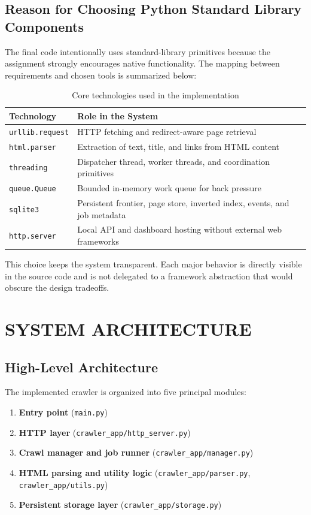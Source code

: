 \documentclass[pdftex,12pt,a4paper]{article}
\begin{document}
\subsection{Reason for Choosing Python Standard Library Components}

The final code intentionally uses standard-library primitives because the assignment strongly encourages native functionality. The mapping between requirements and chosen tools is summarized below:

\begin{table}[H]
\centering
\caption{Core technologies used in the implementation}
\begin{tabular}{|p{4cm}|p{9cm}|}
\hline
\textbf{Technology} & \textbf{Role in the System} \\
\hline
\texttt{urllib.request} & HTTP fetching and redirect-aware page retrieval \\
\hline
\texttt{html.parser} & Extraction of text, title, and links from HTML content \\
\hline
\texttt{threading} & Dispatcher thread, worker threads, and coordination primitives \\
\hline
\texttt{queue.Queue} & Bounded in-memory work queue for back pressure \\
\hline
\texttt{sqlite3} & Persistent frontier, page store, inverted index, events, and job metadata \\
\hline
\texttt{http.server} & Local API and dashboard hosting without external web frameworks \\
\hline
\end{tabular}
\label{tab:core_tech}
\end{table}

This choice keeps the system transparent. Each major behavior is directly visible in the source code and is not delegated to a framework abstraction that would obscure the design tradeoffs.

\section{SYSTEM ARCHITECTURE}
\label{sec:architecture}

\subsection{High-Level Architecture}

The implemented crawler is organized into five principal modules:

\begin{enumerate}
    \item \textbf{Entry point} (\texttt{main.py})
    \item \textbf{HTTP layer} (\texttt{crawler\_app/http\_server.py})
    \item \textbf{Crawl manager and job runner} (\texttt{crawler\_app/manager.py})
    \item \textbf{HTML parsing and utility logic} (\texttt{crawler\_app/parser.py}, \texttt{crawler\_app/utils.py})
    \item \textbf{Persistent storage layer} (\texttt{crawler\_app/storage.py})
\end{enumerate}
\end{document}

